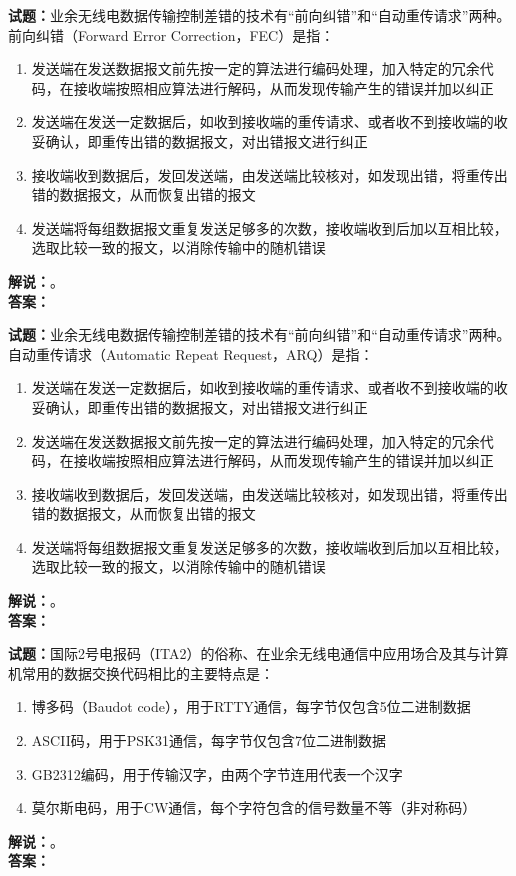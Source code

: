 \documentclass{ctexbook}
\begin{document}
\bigskip

\noindent\textbf{试题：}业余无线电数据传输控制差错的技术有“前向纠错”和“自动重传请求”两种。前向纠错（Forward Error Correction，FEC）是指：
\begin{enumerate}[leftmargin=3em]
  \item 发送端在发送数据报文前先按一定的算法进行编码处理，加入特定的冗余代码，在接收端按照相应算法进行解码，从而发现传输产生的错误并加以纠正
  \item 发送端在发送一定数据后，如收到接收端的重传请求、或者收不到接收端的收妥确认，即重传出错的数据报文，对出错报文进行纠正
  \item 接收端收到数据后，发回发送端，由发送端比较核对，如发现出错，将重传出错的数据报文，从而恢复出错的报文
  \item 发送端将每组数据报文重复发送足够多的次数，接收端收到后加以互相比较，选取比较一致的报文，以消除传输中的随机错误
\end{enumerate}
\noindent\textbf{解说：}\textbf{}。\\\noindent\textbf{答案：}

\bigskip

\noindent\textbf{试题：}业余无线电数据传输控制差错的技术有“前向纠错”和“自动重传请求”两种。自动重传请求（Automatic Repeat Request，ARQ）是指：
\begin{enumerate}[leftmargin=3em]
  \item 发送端在发送一定数据后，如收到接收端的重传请求、或者收不到接收端的收妥确认，即重传出错的数据报文，对出错报文进行纠正
  \item 发送端在发送数据报文前先按一定的算法进行编码处理，加入特定的冗余代码，在接收端按照相应算法进行解码，从而发现传输产生的错误并加以纠正
  \item 接收端收到数据后，发回发送端，由发送端比较核对，如发现出错，将重传出错的数据报文，从而恢复出错的报文
  \item 发送端将每组数据报文重复发送足够多的次数，接收端收到后加以互相比较，选取比较一致的报文，以消除传输中的随机错误
\end{enumerate}
\noindent\textbf{解说：}\textbf{}。\\\noindent\textbf{答案：}

\bigskip

\noindent\textbf{试题：}国际2号电报码（ITA2）的俗称、在业余无线电通信中应用场合及其与计算机常用的数据交换代码相比的主要特点是：
\begin{enumerate}[leftmargin=3em]
  \item 博多码（Baudot code），用于RTTY通信，每字节仅包含5位二进制数据
  \item ASCII码，用于PSK31通信，每字节仅包含7位二进制数据
  \item GB2312编码，用于传输汉字，由两个字节连用代表一个汉字
  \item 莫尔斯电码，用于CW通信，每个字符包含的信号数量不等（非对称码）
\end{enumerate}
\noindent\textbf{解说：}\textbf{}。\\\noindent\textbf{答案：}
\end{document}
